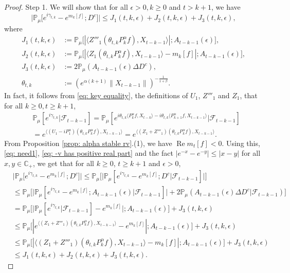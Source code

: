 \documentclass[12pt,a4paper]{amsart}
\theoremstyle{plain}
\theoremstyle{definition}
\numberwithin{equation}{section}
\begin{document}
\begin{proof}
Step 1. We will show that for all $\epsilon > 0, k\geq 0$ and $t>k+1$, we have
\begin{equation}
  \big|\mathbb{P}_{\mu}\big[e^{i\gamma_{t,k}}-e^{m_k[f]}; D^c\big]\big|
  \leq J_1(t,k,\epsilon)+J_2(t,k,\epsilon)+J_3(t,k,\epsilon),
\end{equation}
where
\begin{align}
\label{eq: Def of Ji}
  J_1(t,k,\epsilon)
  & := \mathbb{P}_{\mu}\big[|\langle Z'''_1(\theta_{t,k}P^\alpha_k f), X_{t-k-1}\rangle|; A_{t-k-1}(\epsilon) \big],
  \\ J_2(t,k,\epsilon)
  & := \mathbb{P}_{\mu}\big[|\langle Z_1(\theta_{t,k}P^\alpha_k f),X_{t-k-1}\rangle-m_k[f]|; A_{t-k-1}(\epsilon)\big],
  \\ J_3(t,k, \epsilon)
  & :=2\mathbb{P}_{\mu}(A_{t-k-1}(\epsilon)\Delta D^c),
  \\ \theta_{t,k}
  & := (e^{\alpha( k+1)}\|X_{t-k-1}\|)^{-\frac{1}{1+\beta}}.
\end{align}
In fact, it follows from \eqref{eq: key equality}, the definitions of $U_1$, $Z'''_1$ and $Z_1$, that for all $k\geq 0, t\geq k+1$,
\begin{align}
  \label{eq: need1}
  & \mathbb{P}_{\mu}[e^{i\gamma_{t,k}}|\mathscr{F}_{t-k-1}]
    =\mathbb{P}_{\mu}[e^{i\theta_{t,k}\langle P^\alpha_k f,X_{t-k}\rangle-i\theta_{t,k}\langle P^\alpha_{k+1} f, X_{t-k-1}\rangle}|\mathscr{F}_{t-k-1}] \\
  & =e^{\langle (U_1 - iP^\alpha_1 ) (\theta_{t,k}P^\alpha_k f),X_{t-k-1}\rangle}
    =e^{\langle (Z_1 + Z'''_1) (\theta_{t,k}P^\alpha_k f),X_{t-k-1}\rangle}.
\end{align}
From Proposition \ref{prop: alpha stable rv}.(1), we have $\operatorname {Re} m_t[f] < 0$. 
Using this, \eqref{eq: need1}, \eqref{eq: -v has positive real part} and the fact $|e^{-x} - e^{-y}| \leq |x-y|$ for all $x,y \in \mathbb C_+$, we get that for all $k\geq 0$, $t\geq k+1$ and $\epsilon> 0$,
\begin{align}
  \label{eq: inequality that will used later}
  & \big|\mathbb{P}_{\mu}\big[e^{i\gamma_{t,k}}-e^{m_k[f]}; D^c\big]\big|
    \leq \mathbb{P}_{\mu}\Big[\big| \mathbb{P}_{\mu}[e^{i\gamma_{t,k}}-e^{m_k[f]}; D^c | \mathscr F_{t-k-1}]\big|\Big] \\
  & \leq \mathbb{P}_{\mu}\Big[\big| \mathbb{P}_{\mu}[e^{i\gamma_{t,k}}-e^{m_k[f]}; A_{t-k-1}(\epsilon)| \mathscr F_{t-k-1}]\big| + 2\mathbb P_\mu(A_{t-k-1}(\epsilon) \Delta D^c| \mathscr F_{t-k-1})\Big] \\
  & = \mathbb{P}_{\mu}\Big[ \big|\mathbb{P}_{\mu}[e^{i\gamma_{t,k}}| \mathscr F_{t-k-1}]-e^{m_k[f]}\big|;A_{t-k-1}(\epsilon)\Big] + J_3(t,k,\epsilon) \\
  & \leq \mathbb{P}_{\mu}\big[|e^{\langle (Z_1+Z'''_1) (\theta_{t,k}P^\alpha_k f),X_{t-k-1}\rangle}-e^{m_k[f]}|;A_{t-k-1}(\epsilon)\big]+  J_3(t,k,\epsilon) \\
  & \leq \mathbb{P}_{\mu}\big[|\langle (Z_1+Z'''_1)(\theta_{t,k}P^\alpha_k f),X_{t-k-1}\rangle-m_k[f]|;A_{t-k-1}(\epsilon)\big]+  J_3(t,k,\epsilon) \\
  & \leq J_1(t,k,\epsilon) + J_2(t,k,\epsilon)+J_3(t,k,\epsilon).
\end{align}


\end{proof}
\end{document}
